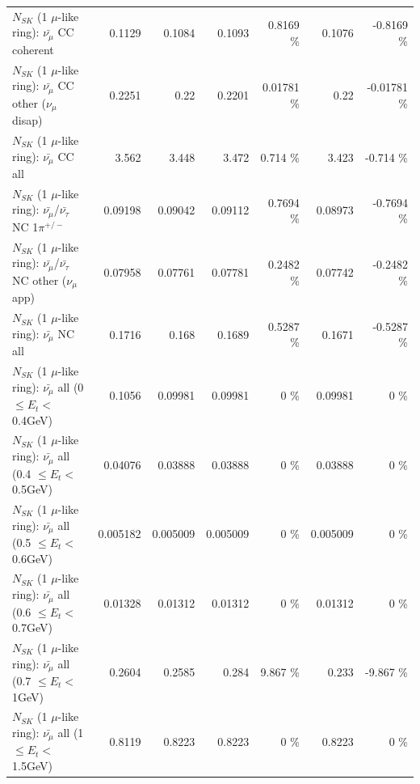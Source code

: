 \begin{table}
\begin{tabular}{| l | r | r | r  r | r  r |}
                       $N_{SK}$ (1 $\mu$-like ring): $\bar{\nu_\mu}$ CC coherent &          0.1129 &          0.1084 &          0.1093 &   0.8169 \%  &          0.1076 &  -0.8169 \%  \\ 
        $N_{SK}$ (1 $\mu$-like ring): $\bar{\nu_\mu}$ CC other ($\nu_\mu$ disap) &          0.2251 &            0.22 &          0.2201 &  0.01781 \%  &            0.22 & -0.01781 \%  \\ 
                          $N_{SK}$ (1 $\mu$-like ring): $\bar{\nu_{\mu}}$ CC all &           3.562 &           3.448 &           3.472 &    0.714 \%  &           3.423 &   -0.714 \%  \\ 
\hline
  $N_{SK}$ (1 $\mu$-like ring): $\bar{\nu_\mu}$/$\bar{\nu_\tau}$ NC 1$\pi^{+/-}$ &         0.09198 &         0.09042 &         0.09112 &   0.7694 \%  &         0.08973 &  -0.7694 \%  \\ 
$N_{SK}$ (1 $\mu$-like ring): $\bar{\nu_\mu}$/$\bar{\nu_\tau}$ NC other ($\nu_\mu$ app) &         0.07958 &         0.07761 &         0.07781 &   0.2482 \%  &         0.07742 &  -0.2482 \%  \\ 
                          $N_{SK}$ (1 $\mu$-like ring): $\bar{\nu_{\mu}}$ NC all &          0.1716 &           0.168 &          0.1689 &   0.5287 \%  &          0.1671 &  -0.5287 \%  \\ 
\hline
   $N_{SK}$ (1 $\mu$-like ring): $\bar{\nu_{\mu}}$ all (0 $\leq E_{t} <$ 0.4GeV) &          0.1056 &         0.09981 &         0.09981 &        0 \%  &         0.09981 &        0 \%  \\ 
 $N_{SK}$ (1 $\mu$-like ring): $\bar{\nu_{\mu}}$ all (0.4 $\leq E_{t} <$ 0.5GeV) &         0.04076 &         0.03888 &         0.03888 &        0 \%  &         0.03888 &        0 \%  \\ 
 $N_{SK}$ (1 $\mu$-like ring): $\bar{\nu_{\mu}}$ all (0.5 $\leq E_{t} <$ 0.6GeV) &        0.005182 &        0.005009 &        0.005009 &        0 \%  &        0.005009 &        0 \%  \\ 
 $N_{SK}$ (1 $\mu$-like ring): $\bar{\nu_{\mu}}$ all (0.6 $\leq E_{t} <$ 0.7GeV) &         0.01328 &         0.01312 &         0.01312 &        0 \%  &         0.01312 &        0 \%  \\ 
   $N_{SK}$ (1 $\mu$-like ring): $\bar{\nu_{\mu}}$ all (0.7 $\leq E_{t} <$ 1GeV) &          0.2604 &          0.2585 &           0.284 &    9.867 \%  &           0.233 &   -9.867 \%  \\ 
   $N_{SK}$ (1 $\mu$-like ring): $\bar{\nu_{\mu}}$ all (1 $\leq E_{t} <$ 1.5GeV) &          0.8119 &          0.8223 &          0.8223 &        0 \%  &          0.8223 &        0 \%  \\ 

\end{tabular}
\end{table}
